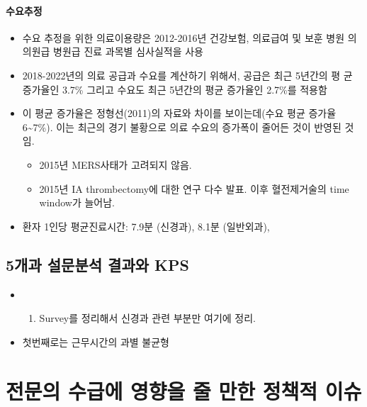 \documentclass[]{book}
\providecommand{\tightlist}{%
  \setlength{\itemsep}{0pt}\setlength{\parskip}{0pt}}
\begin{document}
\hypertarget{section-8}{%
\subsubsection{수요추정}\label{section-8}}

\begin{itemize}
\item
  수요 추정을 위한 의료이용량은 2012-2016년 건강보험, 의료급여 및 보훈 병원 의 의원급 병원급 진료 과목별 심사실적을 사용
\item
  2018-2022년의 의료 공급과 수요를 계산하기 위해서, 공급은 최근 5년간의 평 균 증가율인 3.7\% 그리고 수요도 최근 5년간의 평균 증가율인 2.7\%를 적용함
\item
  이 평균 증가율은 정형선(2011)의 자료와 차이를 보이는데(수요 평균 증가율 6\textasciitilde7\%). 이는 최근의 경기 불황으로 의료 수요의 증가폭이 줄어든 것이 반영된 것임.

  \begin{itemize}
  \tightlist
  \item
    2015년 MERS사태가 고려되지 않음.
  \item
    2015년 IA thrombectomy에 대한 연구 다수 발표. 이후 혈전제거술의 time window가 늘어남.
  \end{itemize}
\item
  환자 1인당 평균진료시간: 7.9분 (신경과), 8.1분 (일반외과),
\end{itemize}

\hypertarget{kps}{%
\section{5개과 설문분석 결과와 KPS}\label{kps}}

\begin{itemize}
\item
  \begin{enumerate}
  \def\labelenumi{\arabic{enumi}.}
  \setcounter{enumi}{5}
  \tightlist
  \item
    Survey를 정리해서 신경과 관련 부분만 여기에 정리.
  \end{enumerate}
\item
  첫번째로는 근무시간의 과별 불균형
\end{itemize}

\hypertarget{section-9}{%
\chapter{전문의 수급에 영향을 줄 만한 정책적 이슈}\label{section-9}}
\end{document}
